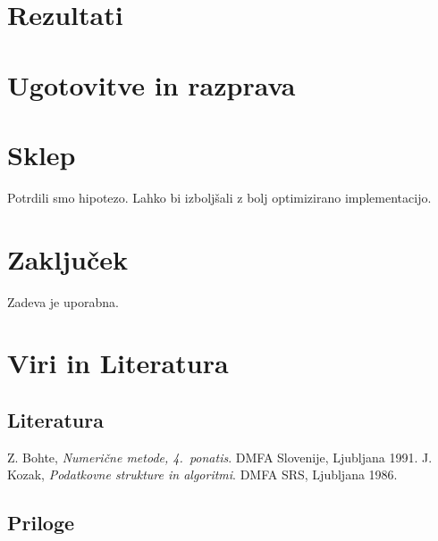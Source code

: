\documentclass[a4paper,oneside]{article}
\begin{document}
\section{Rezultati}
\section{Ugotovitve in razprava}
\section{Sklep}
Potrdili smo hipotezo. Lahko bi izboljšali z bolj optimizirano implementacijo.
\section{Zaključek}
Zadeva je uporabna.
\section{Viri in Literatura}
\subsection{Literatura}
\vspace{-1cm}
\begin{thebibliography}{99}
   {Z. Bohte, \emph{Numerične metode, 4.\ ponatis}. DMFA Slovenije, Ljubljana 1991.}
   {J. Kozak, \emph{Podatkovne strukture in algoritmi}. DMFA SRS, Ljubljana 1986. }
\end{thebibliography}
\subsection{Priloge}
\end{document}
